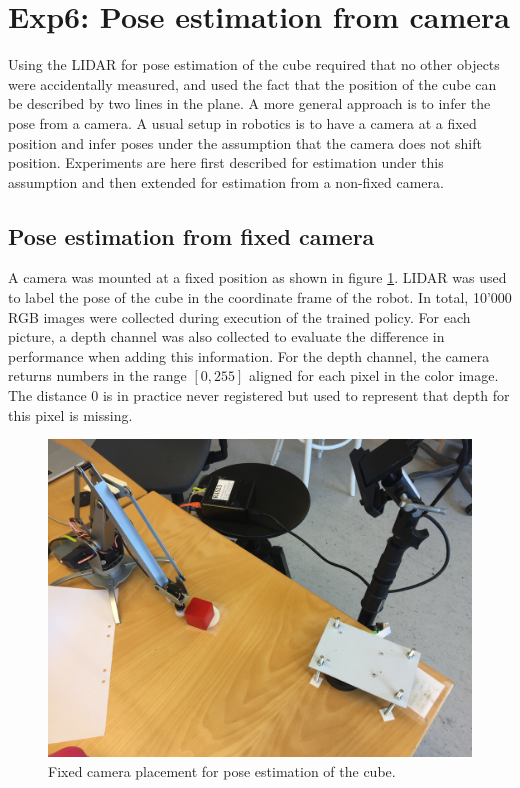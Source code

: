 \section{Exp6: Pose estimation from camera}

Using the LIDAR for pose estimation of the cube required that no other objects
were accidentally measured, and used the fact that the position of the cube can
be described by two lines in the plane. A more general approach is to infer the
pose from a camera. A usual setup in robotics is to have a camera at a fixed
position and infer poses under the assumption that the camera does not shift
position. Experiments are here first described for estimation under this
assumption and then extended for estimation from a non-fixed camera.

\subsection{Pose estimation from fixed camera}

A camera was mounted at a fixed position as shown in figure
\ref{fig:camera_placement_fixed}. LIDAR was used to label the pose of the cube
in the coordinate frame of the robot.  In total, 10'000 RGB images were
collected during execution of the trained policy. For each picture, a depth
channel was also collected to evaluate the difference in performance when
adding this information. For the depth channel, the camera returns numbers in
the range $[0, 255]$ aligned for each pixel in the color image. The distance
$0$ is in practice never registered but used to represent that depth for this
pixel is missing.

\begin{figure}[h!]
    \centering
    \includegraphics[width=0.4 \textwidth]{res/camera_placement_fixed.jpg}

    \caption{Fixed camera placement for pose estimation of the cube.}

    \label{fig:camera_placement_fixed}
    
\end{figure}

